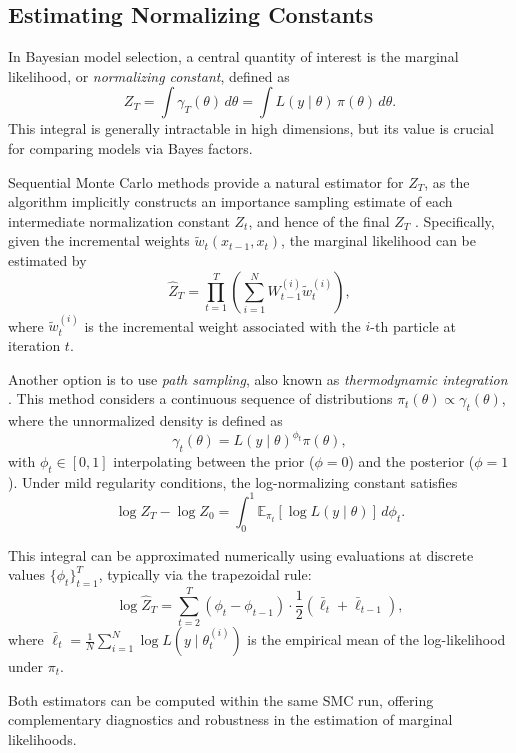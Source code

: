 \documentclass[a4paper, 12pt]{article}
\begin{document}
    \subsection{Estimating Normalizing Constants}

    In Bayesian model selection, a central quantity of interest is the marginal likelihood, or \emph{normalizing constant}, defined as
    \[
    Z_T = \int \gamma_T(\theta)\, d\theta = \int L(y \mid \theta)\, \pi(\theta) \, d\theta.
    \]
    This integral is generally intractable in high dimensions, but its value is crucial for comparing models via Bayes factors.

    Sequential Monte Carlo methods provide a natural estimator for $Z_T$, as the algorithm implicitly constructs an importance sampling estimate of each intermediate normalization constant $Z_t$, and hence of the final $Z_T$ \citep{DelMoral2006}. Specifically, given the incremental weights $\tilde{w}_t(x_{t-1}, x_t)$, the marginal likelihood can be estimated by
    \[
    \hat{Z}_T = \prod_{t=1}^T \left( \sum_{i=1}^N W_{t-1}^{(i)} \tilde{w}_t^{(i)} \right),
    \]
    where $\tilde{w}_t^{(i)}$ is the incremental weight associated with the $i$-th particle at iteration $t$.

    Another option is to use \emph{path sampling}, also known as \emph{thermodynamic integration} \citep{Gelman1998}. This method considers a continuous sequence of distributions $\pi_t(\theta) \propto \gamma_t(\theta)$, where the unnormalized density is defined as
    \[
    \gamma_t(\theta) = L(y \mid \theta)^{\phi_t} \pi(\theta),
    \]
    with $\phi_t \in [0,1]$ interpolating between the prior ($\phi = 0$) and the posterior ($\phi = 1$). Under mild regularity conditions, the log-normalizing constant satisfies
    \[
    \log Z_T - \log Z_0 = \int_0^1 \mathbb{E}_{\pi_t} \left[ \log L(y \mid \theta) \right] \, d\phi_t.
    \]

    This integral can be approximated numerically using evaluations at discrete values $\{\phi_t\}_{t=1}^T$, typically via the trapezoidal rule:
    \[
    \log \hat{Z}_T = \sum_{t=2}^T (\phi_t - \phi_{t-1}) \cdot \frac{1}{2} \left( \bar{\ell}_{t} + \bar{\ell}_{t-1} \right),
    \]
    where $\bar{\ell}_t = \frac{1}{N} \sum_{i=1}^N \log L(y \mid \theta_t^{(i)})$ is the empirical mean of the log-likelihood under $\pi_t$.

    Both estimators can be computed within the same SMC run, offering complementary diagnostics and robustness in the estimation of marginal likelihoods.
\end{document}

